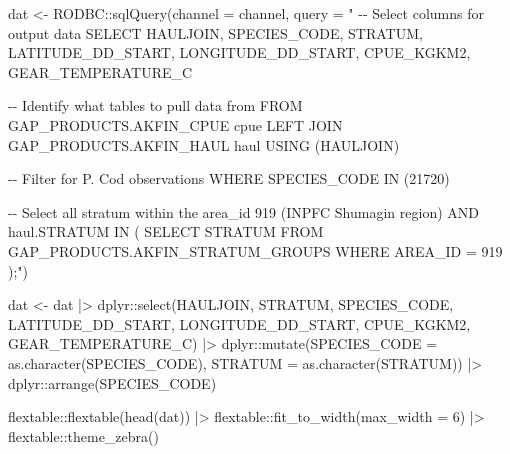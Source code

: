\documentclass[
  letterpaper,
  oneside,
  open=any]{scrbook}
\newenvironment{Shaded}{\begin{snugshade}}{\end{snugshade}}
\newcommand{\AttributeTok}[1]{\textcolor[rgb]{0.40,0.45,0.13}{#1}}
\newcommand{\DecValTok}[1]{\textcolor[rgb]{0.68,0.00,0.00}{#1}}
\newcommand{\FunctionTok}[1]{\textcolor[rgb]{0.28,0.35,0.67}{#1}}
\newcommand{\NormalTok}[1]{\textcolor[rgb]{0.00,0.23,0.31}{#1}}
\newcommand{\OtherTok}[1]{\textcolor[rgb]{0.00,0.23,0.31}{#1}}
\newcommand{\SpecialCharTok}[1]{\textcolor[rgb]{0.37,0.37,0.37}{#1}}
\newcommand{\StringTok}[1]{\textcolor[rgb]{0.13,0.47,0.30}{#1}}
\begin{document}
\begin{Shaded}
\begin{Highlighting}[]
\NormalTok{dat }\OtherTok{\textless{}{-}}\NormalTok{ RODBC}\SpecialCharTok{::}\FunctionTok{sqlQuery}\NormalTok{(}\AttributeTok{channel =}\NormalTok{ channel,}
                       \AttributeTok{query =}
                         \StringTok{"}
\StringTok{{-}{-} Select columns for output data}
\StringTok{SELECT }
\StringTok{HAULJOIN, }
\StringTok{SPECIES\_CODE, }
\StringTok{STRATUM, }
\StringTok{LATITUDE\_DD\_START, }
\StringTok{LONGITUDE\_DD\_START,}
\StringTok{CPUE\_KGKM2, }
\StringTok{GEAR\_TEMPERATURE\_C}

\StringTok{{-}{-} Identify what tables to pull data from}
\StringTok{FROM GAP\_PRODUCTS.AKFIN\_CPUE cpue}
\StringTok{LEFT JOIN GAP\_PRODUCTS.AKFIN\_HAUL haul}
\StringTok{USING (HAULJOIN) }

\StringTok{{-}{-} Filter for P. Cod observations}
\StringTok{WHERE SPECIES\_CODE IN (21720)}

\StringTok{{-}{-} Select all stratum within the area\_id 919 (INPFC Shumagin region)}
\StringTok{AND haul.STRATUM IN}
\StringTok{(}
\StringTok{SELECT }
\StringTok{STRATUM}
\StringTok{FROM GAP\_PRODUCTS.AKFIN\_STRATUM\_GROUPS }
\StringTok{WHERE AREA\_ID = 919}
\StringTok{);"}\NormalTok{)}
\end{Highlighting}
\end{Shaded}

\begin{Shaded}
\begin{Highlighting}[]
\NormalTok{dat }\OtherTok{\textless{}{-}}\NormalTok{ dat }\SpecialCharTok{|\textgreater{}} 
\NormalTok{  dplyr}\SpecialCharTok{::}\FunctionTok{select}\NormalTok{(HAULJOIN, STRATUM, SPECIES\_CODE, LATITUDE\_DD\_START, LONGITUDE\_DD\_START, CPUE\_KGKM2, GEAR\_TEMPERATURE\_C) }\SpecialCharTok{|\textgreater{}} 
\NormalTok{  dplyr}\SpecialCharTok{::}\FunctionTok{mutate}\NormalTok{(}\AttributeTok{SPECIES\_CODE =} \FunctionTok{as.character}\NormalTok{(SPECIES\_CODE), }
                \AttributeTok{STRATUM =} \FunctionTok{as.character}\NormalTok{(STRATUM)) }\SpecialCharTok{|\textgreater{}} 
\NormalTok{  dplyr}\SpecialCharTok{::}\FunctionTok{arrange}\NormalTok{(SPECIES\_CODE)}

\NormalTok{flextable}\SpecialCharTok{::}\FunctionTok{flextable}\NormalTok{(}\FunctionTok{head}\NormalTok{(dat)) }\SpecialCharTok{|\textgreater{}}   
\NormalTok{  flextable}\SpecialCharTok{::}\FunctionTok{fit\_to\_width}\NormalTok{(}\AttributeTok{max\_width =} \DecValTok{6}\NormalTok{) }\SpecialCharTok{|\textgreater{}} 
\NormalTok{  flextable}\SpecialCharTok{::}\FunctionTok{theme\_zebra}\NormalTok{()}
\end{Highlighting}
\end{Shaded}
\end{document}
